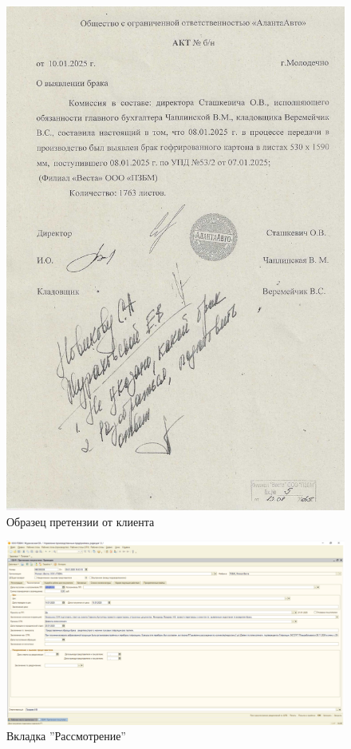 \begin{figure}
\begin{center}
 \includegraphics[height=0.9\textheight, keepaspectratio]{Pics/Акт 4.jpg}
\end{center}
 \caption{Образец претензии от клиента}
 \label{pic:/Акт 4.}
\end{figure}

\begin{figure}
\begin{center}
 \includegraphics[height=0.35\textheight, keepaspectratio]{Pics/VIIIпретензии3.png}
\end{center}
 \caption{Вкладка ''Рассмотрение''}
 \label{pic:/VIIIпретензии3}
\end{figure}

